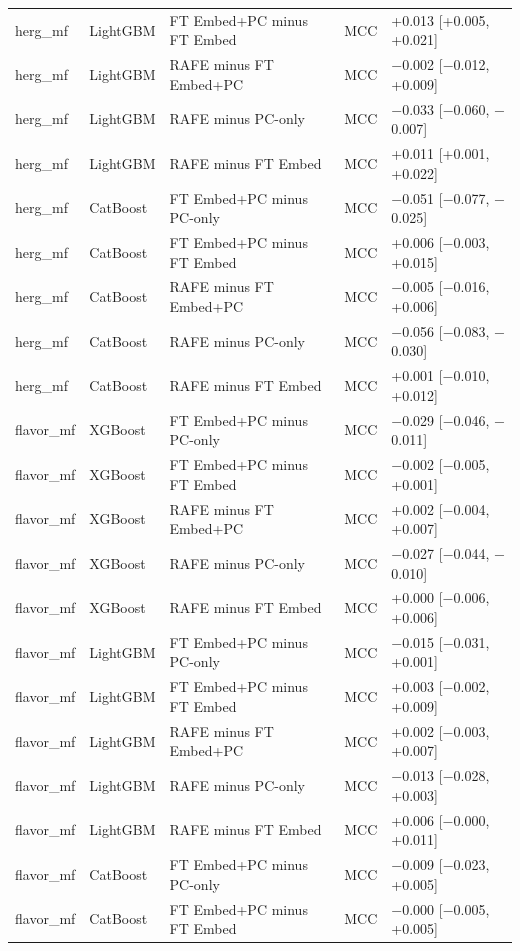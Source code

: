 \begin{longtable}{llllp{4.2cm}}
herg\_mf & LightGBM & FT Embed+PC minus FT Embed & MCC & +0.013 [+0.005, +0.021] \\
herg\_mf & LightGBM & RAFE minus FT Embed+PC & MCC & $-$0.002 [$-$0.012, +0.009] \\
herg\_mf & LightGBM & RAFE minus PC-only & MCC & $-$0.033 [$-$0.060, $-$0.007] \\
herg\_mf & LightGBM & RAFE minus FT Embed & MCC & +0.011 [+0.001, +0.022] \\
herg\_mf & CatBoost & FT Embed+PC minus PC-only & MCC & $-$0.051 [$-$0.077, $-$0.025] \\
herg\_mf & CatBoost & FT Embed+PC minus FT Embed & MCC & +0.006 [$-$0.003, +0.015] \\
herg\_mf & CatBoost & RAFE minus FT Embed+PC & MCC & $-$0.005 [$-$0.016, +0.006] \\
herg\_mf & CatBoost & RAFE minus PC-only & MCC & $-$0.056 [$-$0.083, $-$0.030] \\
herg\_mf & CatBoost & RAFE minus FT Embed & MCC & +0.001 [$-$0.010, +0.012] \\
flavor\_mf & XGBoost & FT Embed+PC minus PC-only & MCC & $-$0.029 [$-$0.046, $-$0.011] \\
flavor\_mf & XGBoost & FT Embed+PC minus FT Embed & MCC & $-$0.002 [$-$0.005, +0.001] \\
flavor\_mf & XGBoost & RAFE minus FT Embed+PC & MCC & +0.002 [$-$0.004, +0.007] \\
flavor\_mf & XGBoost & RAFE minus PC-only & MCC & $-$0.027 [$-$0.044, $-$0.010] \\
flavor\_mf & XGBoost & RAFE minus FT Embed & MCC & +0.000 [$-$0.006, +0.006] \\
flavor\_mf & LightGBM & FT Embed+PC minus PC-only & MCC & $-$0.015 [$-$0.031, +0.001] \\
flavor\_mf & LightGBM & FT Embed+PC minus FT Embed & MCC & +0.003 [$-$0.002, +0.009] \\
flavor\_mf & LightGBM & RAFE minus FT Embed+PC & MCC & +0.002 [$-$0.003, +0.007] \\
flavor\_mf & LightGBM & RAFE minus PC-only & MCC & $-$0.013 [$-$0.028, +0.003] \\
flavor\_mf & LightGBM & RAFE minus FT Embed & MCC & +0.006 [$-$0.000, +0.011] \\
flavor\_mf & CatBoost & FT Embed+PC minus PC-only & MCC & $-$0.009 [$-$0.023, +0.005] \\
flavor\_mf & CatBoost & FT Embed+PC minus FT Embed & MCC & $-$0.000 [$-$0.005, +0.005] \\

\end{longtable}
